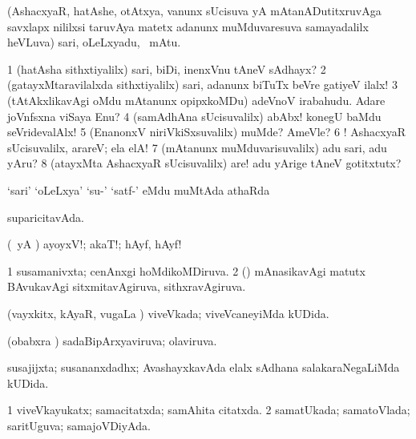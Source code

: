 \bentry
{} 
\gl{\BAavayx}
\expl{}
\bmng
(AshacxyaR, hatAshe, otAtxya, \mo vanunx sUcisuva yA mAtanADutitxruvAga savxlapx nililxsi taruvAya matetx adanunx muMduvaresuva samayadalilx heVLuva) sari, oLeLxyadu, \mo\ mAtu. 
\emng

\noindent 
\gl{\pagu}
\expl{}
\bmng
\bnum
\num{1}  (hatAsha sithxtiyalilx) sari, biDi, inenxVnu tAneV sAdhayx? 
\num{2}  (gatayxMtaravilalxda sithxtiyalilx) sari, adanunx biTuTx beVre gatiyeV ilalx! 
\num{3}  (tAtAkxlikavAgi oMdu mAtanunx opipxkoMDu) adeVnoV irabahudu. Adare joVnfsxna viSaya Enu? 
\num{4}  (samAdhAna sUcisuvalilx) abAbx! konegU baMdu seVridevalAlx! 
\num{5}  (EnanonxV niriVkiSxsuvalilx) muMde? AmeVle? 
\num{6} ! AshacxyaR sUcisuvalilx, arareV; ela elA! 
\num{7}  (mAtanunx muMduvarisuvalilx) adu sari, adu yAru? 
\num{8}  (atayxMta AshacxyaR sUcisuvalilx) are! adu yArige tAneV gotitxtutx? 
\enum
\emng
\eentry

\bentry
{} 
\gl{\sapUpa}
\expl{}
\bmng
`sari' `oLeLxya' `su-' `satf-' eMdu muMtAda athaRda \sapUpa 
\emng
\eentry

\bentry
{} 
\gl{\gu}
\expl{}
\bmng
suparicitavAda. 
\emng
\eentry

\bentry
{} 
\gl{\BAavayx}
\expl{}
\bmng
(\pArxparx\ yA \hA) ayoyxV!; akaT!; hAyf, hAyf! 
\emng
\eentry

\bentry
{} 
\gl{\gu}
\expl{}
\bmng
\bnum
\num{1} susamanivxta; cenAnxgi hoMdikoMDiruva. 
\num{2} (\mashA) mAnasikavAgi matutx BAvukavAgi sitxmitavAgiruva, sithxravAgiruva. 
\enum
\emng
\eentry

\bentry
{} 
\gl{\gu}
\expl{}
\bmng
(vayxkitx, kAyaR, \mo vugaLa \vi) viveVkada; viveVcaneyiMda kUDida. 
\emng
\eentry

\bentry
{} 
\gl{\gu}
\expl{}
\bmng
(obabxra \vi) sadaBipArxyaviruva; olaviruva. 
\emng
\eentry

\bentry
{} 
\gl{\gu}
\expl{}
\bmng
susajijxta; susananxdadhx; AvashayxkavAda elalx sAdhana salakaraNegaLiMda kUDida. 
\emng
\eentry

\bentry
{} 
\gl{\gu}
\expl{}
\bmng
\bnum
\num{1} viveVkayukatx; samacitatxda; samAhita citatxda. 
\num{2} samatUkada; samatoVlada; saritUguva; samajoVDiyAda. 
\enum
\emng
\eentry

